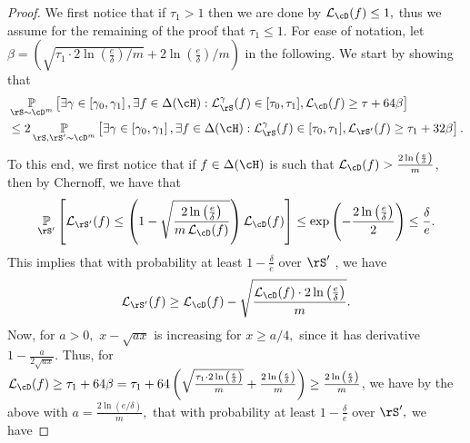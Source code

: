  \begin{proof}
    We first notice that if $ \tau_{1}>1 $ then we are done by $
    \ls_{\cD}(f)\leq 1,$ thus we assume for the remaining of the proof
    that $ \tau_{1}\leq 1.$ For ease of notation, let $
    \beta=\left(\sqrt{\tau_{1}\cdot 2 \ln{\left(\frac{e}{\delta}
          \right)}/m} +2\ln{\left(\frac{e}{\delta} \right)}/m\right)$ in the following.   
    We start by showing that
    \begin{align}\label{eq:marginbound-1}
        &\p_{\rS\sim\cD^{m} }\left[
        \exists \gamma \in \left[\gamma_{0},\gamma_{1}\right],
         \exists f \in \dlh: 
         \ls_{\rS}^{\gamma}(f)\in [\tau_{0},\tau_{1}] ,\ls_{\cD}(f) \geq \tau+64\beta\right] 
        \\
        &\leq 2
        \p_{\rS,\rS'\sim\cD^{m}}\left[\exists \gamma \in \left[\gamma_{0},\gamma_{1}\right],\exists f\in \dlh: \ls_{\rS}^{\gamma}(f)\in [\tau_{0},\tau_{1}] ,\ls_{\rS'}(f) \geq \tau_{1} + 32\beta\right]\nonumber.
    \end{align}
    To this end, we first notice that if $ f\in \dlh $ is such that $ \ls_{\cD}(f)> \frac{2\ln{\left(\frac{e}{\delta} \right)}}{m} $, then 
   by Chernoff, we have that 
   \begin{align*}
    \p_{\rS'}\left[\ls_{\rS'}(f)\leq \left(1-\sqrt{\frac{2\ln{\left(\frac{e}{\delta} \right)}}{m\ls_{\cD}(f)}}\right)\ls_{\cD}(f)\right]\nonumber
    \leq
     \exp{\left(-\frac{2\ln{\left(\frac{e}{\delta} \right)}}{2} \right)}\nonumber
     \leq  \frac{\delta}{e}.\nonumber
   \end{align*}
   This implies that with probability at least $ 1-\frac{\delta}{e}$ over $ \rS' $ , we have 
   \begin{align}
    \ls_{\rS'}(f)\geq \ls_{\cD}(f)-\sqrt{\frac{\ls_{\cD}(f)\cdot 2\ln{\left(\frac{e}{\delta} \right)}}{m}}.\nonumber
   \end{align} 
   Now,  for $ a>0,$  $ x-\sqrt{ax} $ is increasing for $ x\geq a/4,$ since it has derivative $ 1-\frac{a}{2\sqrt{ax}}$. Thus, for  $\ls_{\cD}(f) \geq\tau_{1}+64\beta =\tau_{1} +\cc\left(\sqrt{\frac{\tau_{1}\cdot 2 \ln{\left(\frac{e}{\delta} \right)}}{m}} +\frac{2\ln{\left(\frac{e}{\delta} \right)}}{m}\right) \geq \frac{2\ln{\left(\frac{e}{\delta} \right)}}{m}$, we have by the above with $ a=\frac{2\ln{\left(e/\delta \right)}}{m},$ that with probability at least $ 1-\frac{\delta}{e}$ over $ \rS',$  we have
   

\end{proof}
